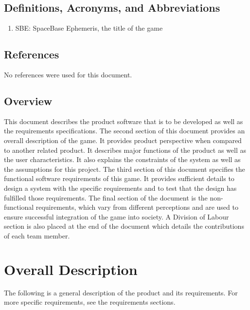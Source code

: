 \documentclass[]{article}
\begin{document}
\subsection{Definitions, Acronyms, and Abbreviations}
\label{sub:definitions_acronyms_and_abbreviations}
\begin{enumerate}
	\item SBE: SpaceBase Ephemeris, the title of the game
\end{enumerate}

\subsection{References}
\label{sub:references}
	No references were used for this document.

\subsection{Overview}
\label{sub:overview}
	This document describes the product software that is to be developed as well as the requirements specifications. The second section of this document provides an overall description of the game. It provides product perspective when compared to another related product. It describes major functions of the product as well as the user characteristics. It also explains the constraints of the system as well as the assumptions for this project. The third section of this document specifies the functional software requirements of this game. It provides sufficient details to design a system with the specific requirements and to test that the design has fulfilled those requirements. The final section of the document is the non-functional requirements, which vary from different perceptions and are used to ensure successful integration of the game into society. A Division of Labour section is also placed at the end of the document which details the contributions of each team member.


\section{Overall Description}
\label{sec:overall_description}

The following is a general description of the product and its requirements. For more specific requirements, see the requirements sections.
\end{document}
